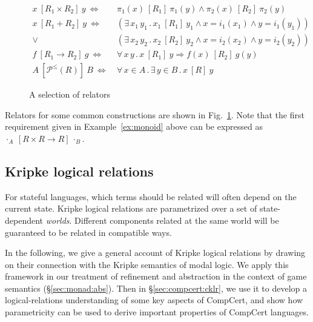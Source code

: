 \documentclass[sigplan,10pt,review,anonymous]{acmart}
\newcommand{\ifr}[1]{\ [{#1}]\ }
\begin{document}
\begin{figure} %
  {\small
  \begin{align*}
    x \ifr{R_1 \times R_2} y \ \Leftrightarrow\  &
      \pi_1(x) \ifr{R_1} \pi_1(y) \wedge
      \pi_2(x) \ifr{R_2} \pi_2(y) \\
    x \ifr{R_1 + R_2} y \ \Leftrightarrow\  &
      (\exists \, x_1 \, y_1 \,.\,
        x_1 \ifr{R_1} y_1 \wedge
        x = i_1(x_1) \wedge
        y = i_1(y_1)) \\ \vee\ &
      (\exists \, x_2 \, y_2 \,.\,
        x_2 \ifr{R_2} y_2 \wedge
        x = i_2(x_2) \wedge
        y = i_2(y_2)) \\
    f \ifr{R_1 \rightarrow R_2} g \ \Leftrightarrow\  &
      \forall \, x \, y \,.\,
        x \ifr{R_1} y \Rightarrow
        f(x) \ifr{R_2} g(y) \\
    A \ifr{\mathcal{P}^\le(R)} B \ \Leftrightarrow\  &
      \forall \, x \in A \,.\,
      \exists \, y \in B \,.\,
      x \ifr{R} y
  \end{align*}
  }%
  \caption{A selection of relators}
  \label{fig:relators}
\end{figure}

Relators for some common constructions are shown in Fig.~\ref{fig:relators}.
Note that the first requirement given in Example~\ref{ex:monoid} above
can be expressed as
$
  \cdot_A \ifr{R \times R \rightarrow R} \cdot_B
$.



\subsection{Kripke logical relations} %
\label{sec:klr}

For stateful languages,
which terms should be related
will often depend on the current state.
Kripke logical relations
are parametrized over a set of state-dependent \emph{worlds}.
Different components related at the same world
will be guaranteed to be related in compatible ways.

In the following,
we give a general account of Kripke logical relations
by drawing on their connection with
the Kripke semantics of modal logic.
We apply this framework
in our treatment of refinement and abstraction
in the context of game semantics (\S\ref{sec:monad:abs}).
Then in \S\ref{sec:compcert:cklr},
we use it to develop a logical-relations
understanding of some key aspects of CompCert,
and show how parametricity
can be used to derive important properties
of CompCert languages.
\end{document}
